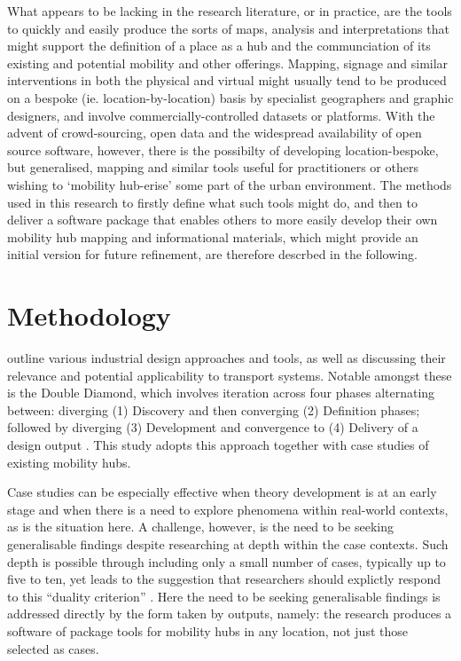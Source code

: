 \documentclass[preprint, 3p,
authoryear]{elsarticle} %
\begin{document}
What appears to be lacking in the research literature, or in practice,
are the tools to quickly and easily produce the sorts of maps, analysis
and interpretations that might support the definition of a place as a
hub and the communciation of its existing and potential mobility and
other offerings. Mapping, signage and similar interventions in both the
physical and virtual might usually tend to be produced on a bespoke (ie.
location-by-location) basis by specialist geographers and graphic
designers, and involve commercially-controlled datasets or platforms.
With the advent of crowd-sourcing, open data and the widespread
availability of open source software, however, there is the possibilty
of developing location-bespoke, but generalised, mapping and similar
tools useful for practitioners or others wishing to `mobility hub-erise'
some part of the urban environment. The methods used in this research to
firstly define what such tools might do, and then to deliver a software
package that enables others to more easily develop their own mobility
hub mapping and informational materials, which might provide an initial
version for future refinement, are therefore descrbed in the following.

\section{Methodology}\label{methodology}

\citet{Coxon:2018aa,Coxon:2021ab} outline various industrial design
approaches and tools, as well as discussing their relevance and
potential applicability to transport systems. Notable amongst these is
the Double Diamond, which involves iteration across four phases
alternating between: diverging (1) Discovery and then converging (2)
Definition phases; followed by diverging (3) Development and convergence
to (4) Delivery of a design output \citep{UK-Design-Council:0aa}. This
study adopts this approach together with case studies of existing
mobility hubs.

Case studies can be especially effective when theory development is at
an early stage and when there is a need to explore phenomena within
real-world contexts, as is the situation here. A challenge, however, is
the need to be seeking generalisable findings despite researching at
depth within the case contexts. Such depth is possible through including
only a small number of cases, typically up to five to ten, yet leads to
the suggestion that researchers should explictly respond to this
``duality criterion''
\citep{Benbasat:1987aa,Eisenhardt:1989aa,Dyer:1991aa,Cavaye:1996aa,Darke:1998aa,Meredith:1998aa,Stuart:2002aa,Voss:2002aa,Denscombe:2007aa,Eisenhardt:2007aa,Yin:2009ab,Ketokivi:2014aa,Yin:2014ab,Yin:2018ab}.
Here the need to be seeking generalisable findings is addressed directly
by the form taken by outputs, namely: the research produces a software
of package tools for mobility hubs in any location, not just those
selected as cases.
\end{document}
